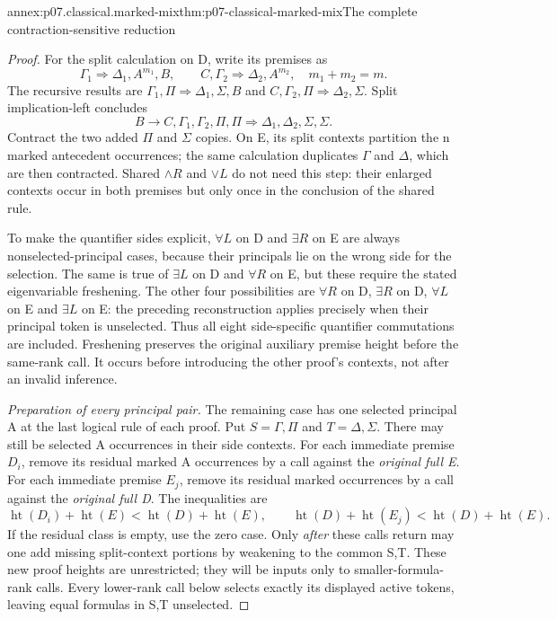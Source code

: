 \begin{annexitem}{annex:p07.classical.marked-mix}{thm:p07-classical-marked-mix}{The complete contraction-sensitive reduction}
\begin{proof}
For the split calculation on D, write its premises as
\[
 \Gamma_1\Rightarrow\Delta_1,A^{m_1},B,
 \qquad C,\Gamma_2\Rightarrow\Delta_2,A^{m_2},
 \quad m_1+m_2=m.
\]
The recursive results are
\(\Gamma_1,\Pi\Rightarrow\Delta_1,\Sigma,B\) and
\(C,\Gamma_2,\Pi\Rightarrow\Delta_2,\Sigma\).
Split implication-left concludes
\[
 B\to C,\Gamma_1,\Gamma_2,\Pi,\Pi
 \Rightarrow\Delta_1,\Delta_2,\Sigma,\Sigma.
\]
Contract the two added \(\Pi\) and \(\Sigma\) copies. On E, its split
contexts partition the n marked antecedent occurrences; the same
calculation duplicates \(\Gamma\) and \(\Delta\), which are then
contracted. Shared \(\land R\) and \(\lor L\) do not need this step:
their enlarged contexts occur in both premises but only once in the
conclusion of the shared rule.

To make the quantifier sides explicit, \(\forall L\) on D and
\(\exists R\) on E are always nonselected-principal cases, because
their principals lie on the wrong side for the selection. The same is
true of \(\exists L\) on D and \(\forall R\) on E, but these require
the stated eigenvariable freshening. The other four possibilities are
\(\forall R\) on D, \(\exists R\) on D, \(\forall L\) on E and
\(\exists L\) on E: the preceding reconstruction applies precisely
when their principal token is unselected. Thus all eight side-specific
quantifier commutations are included. Freshening preserves the original
auxiliary premise height before the same-rank call. It occurs before
introducing the other proof's contexts, not after an invalid inference.

\emph{Preparation of every principal pair.}
The remaining case has one selected principal A at the last logical
rule of each proof. Put \(S=\Gamma,\Pi\) and \(T=\Delta,\Sigma\).
There may still be selected A occurrences in their side contexts.
For each immediate premise \(D_i\), remove its residual marked A
occurrences by a call against the \emph{original full E}. For each
immediate premise \(E_j\), remove its residual marked occurrences by
a call against the \emph{original full D}. The inequalities are
\[
 \operatorname{ht}(D_i)+\operatorname{ht}(E)
 <\operatorname{ht}(D)+\operatorname{ht}(E),
 \qquad
 \operatorname{ht}(D)+\operatorname{ht}(E_j)
 <\operatorname{ht}(D)+\operatorname{ht}(E).
\]
If the residual class is empty, use the zero case. Only \emph{after}
these calls return may one add missing split-context portions by
weakening to the common S,T. These new proof heights are unrestricted;
they will be inputs only to smaller-formula-rank calls. Every lower-rank
call below selects exactly its displayed active tokens, leaving equal
formulas in S,T unselected.


\end{proof}
\end{annexitem}
